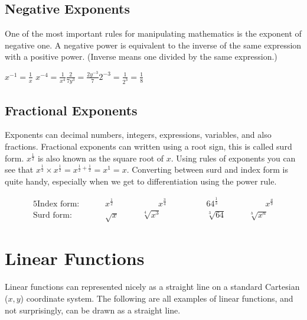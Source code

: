 \subsection*{Negative Exponents}
One of the most important rules for manipulating mathematics is the exponent of negative one. A negative power is equivalent to the inverse of the same expression with a positive power. (Inverse means one divided by the same expression.)\\

\begin{tcolorbox}
	\hspace{1cm}$x^{-1}=\frac{1}{x}$ \hspace{2cm}$x^{-4}=\frac{1}{x^4}$\hspace{2cm}$\frac{2}{7y^3}=\frac{2y^{-3}}{7} $\hspace{2cm}$2^{-3}=\frac{1}{2^3}=\frac{1}{8} $
\end{tcolorbox}	

\subsection*{Fractional Exponents}
Exponents can decimal numbers, integers, expressions, variables, and also fractions. Fractional exponents can written using a root sign, this is called surd form. $x^{\frac{1}{2}}$ is also known as the square root of $x$. Using rules of exponents you can see that $x^{\frac{1}{2}}\times x^{\frac{1}{2}}=x^{\frac{1}{2}+\frac{1}{2}}=x^1=x$. Converting between surd and index form is quite handy, especially when we get to differentiation using the power rule.
\begin{tcolorbox}\begin{alignat*}{5}
\textrm{Index form: }\qquad&x^{\frac{1}{2}}&\qquad\qquad x^{\frac{3}{4}} &\qquad\qquad 64^{\frac{1}{3}}&\qquad\qquad x^\frac{a}{b}\\
\textrm{Surd form: }\qquad&\sqrt{x}&\qquad \sqrt[4]{x^3}&\qquad\qquad\sqrt[3]{64}&\qquad \sqrt[b]{x^a}
\end{alignat*}\end{tcolorbox}
	
\section{Linear Functions}
Linear functions can represented nicely as a straight line on a standard Cartesian ($x,y$) coordinate system. The following are all examples of linear functions, and not surprisingly, can be drawn as a straight line.

